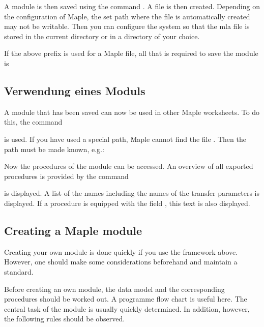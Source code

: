 \bigskip

A module is then saved using the command . A file  is then created. Depending on the configuration of Maple, the set path where the file is automatically created may not be writable. Then you can configure the system so that the mla file is stored in the current directory or in a directory of your choice. 

\bigskip

If the above prefix is used for a Maple file, all that is required to save the module is



\subsection{Verwendung eines Moduls}


A module that has been saved can now be used in other Maple worksheets. To do this, the command


is used. If you have used a special path, Maple cannot find the file . Then the path must be made known, e.g.:


Now the procedures of the module can be accessed. An overview of all exported procedures is provided by the command


is displayed. A list of the names including the names of the transfer parameters is displayed. If a procedure is equipped with the field , this text is also displayed.


\subsection{Creating a Maple module}

Creating your own module is done quickly if you use the framework above. However, one should make some considerations beforehand and maintain a standard. 

\bigskip

Before creating an own module, the data model and the corresponding procedures should be worked out. A programme flow chart is useful here. The central task of the module is usually quickly determined. In addition, however, the following rules should be observed.


